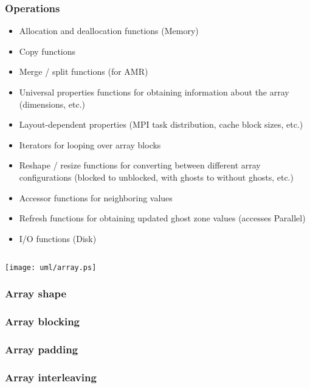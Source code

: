 \subsubsection{Operations}

\begin{itemize}
\item Allocation and deallocation functions (Memory)
\item Copy functions
\item Merge / split functions (for AMR)
\item Universal properties functions for obtaining information about
  the array (dimensions, etc.)
\item Layout-dependent properties (MPI task distribution, cache block
  sizes, etc.)
\item Iterators for looping over array blocks
\item Reshape / resize functions for converting between different
  array configurations (blocked to unblocked, with ghosts to without
  ghosts, etc.)
\item Accessor functions for neighboring values
\item Refresh functions for obtaining updated ghost zone values
  (accesses Parallel)
\item I/O functions (Disk)
\end{itemize}

\subsection{}

\centerline{\texttt{[image: uml/array.ps]}}

\subsubsection{Array shape}

\subsubsection{Array blocking}

\subsubsection{Array padding}

\subsubsection{Array interleaving}


